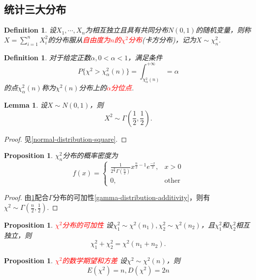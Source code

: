 \documentclass{article}
\newtheorem{lemma}[theorem]{Lemma}
\newtheorem{proposition}[theorem]{Proposition}
\newtheorem{definition}[theorem]{Definition}
\newcommand{\redt}[1]{\textcolor{red}{#1}}
\begin{document}
\subsection{统计三大分布}

\begin{definition}
\rm 设$X_1,\cdots,X_n$为相互独立且具有共同分布$N(0,1)$的随机变量，则称$X=\sum\limits_{i=1}^n X_i^2$的分布服从\redt{自由度为$n$的$\chi ^2$分布}(卡方分布)，记为$X \sim \chi_n^2$.
\end{definition}

\begin{definition}
\rm 对于给定正数$\alpha, 0 <\alpha <1$，满足条件
$$
P\{\chi^2 > \chi_\alpha^2(n)\} = \int_{\chi_\alpha^2(n)}^{+\infty} = \alpha
$$
的点$\chi_\alpha^2(n)$称为$\chi^2(n)$分布上的\redt{$\alpha$分位点}. 
\end{definition}

\begin{lemma}\label{for-chi-proof}
\rm 设$X \sim N(0,1)$，则
$$
X^2 \sim \Gamma(\frac{1}{2},\frac{1}{2}). 
$$
\end{lemma}

\begin{proof}
见\ref{normal-distribution-square}. 
\end{proof}

\begin{proposition}
\rm $\chi_n^2$分布的概率密度为
$$
f(x) =  \left\{
\begin{array}{ll}
\frac{1}{2^\frac{n}{2}\Gamma(\frac{n}{2})} x^{\frac{n}{2}-1}e^{\frac{-x}{2}}, & x > 0 \\
0, & \text{other}
\end{array} \right. 
$$
\end{proposition}

\begin{proof}
由\ref{for-chi-proof}配合$\Gamma$分布的可加性\ref{gamma-distribution-additivity}，则有$\chi^2 \sim \Gamma(\frac{n}{2},\frac{1}{2})$. 
\end{proof}

\begin{proposition}
\rm \redt{$\chi^2$分布的可加性} 设$\chi_1^2 \sim \chi^2(n_1),\chi_2^2 \sim \chi^2(n_2)$，且$\chi_1^2$和$\chi_2^2$相互独立，则
$$
\chi_1^2 + \chi_2^2 = \chi^2(n_1 + n_2). 
$$
\end{proposition}

\begin{proposition}
\rm \redt{$\chi^2$的数学期望和方差} 设$\chi^2 \sim \chi^2(n)$，则
$$
E(\chi^2) = n, D(\chi^2) = 2n
$$
\end{proposition}
\end{document}
